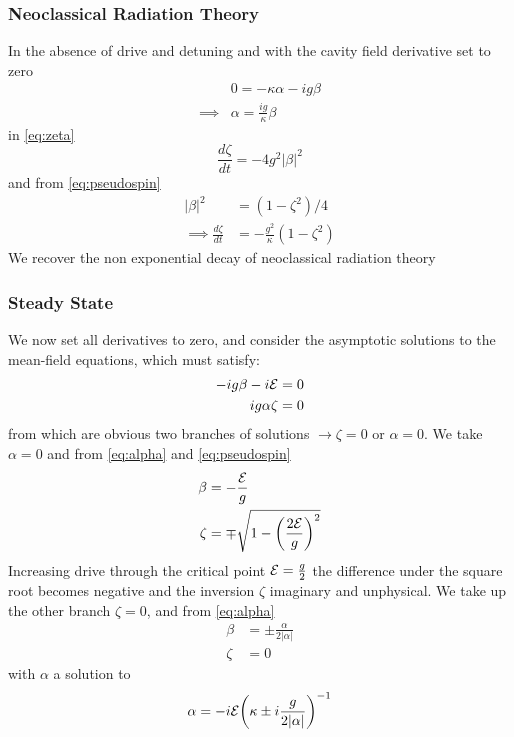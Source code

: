 \subsubsection{Neoclassical Radiation Theory}
In the absence of drive and detuning and with the cavity field derivative set to zero
\begin{align}
  & 0 = -\kappa \alpha - ig \beta \\
  \implies & \alpha = \frac{ig}{\kappa} \beta
\end{align}
in \cref{eq:zeta}
\begin{equation}
  \frac{d \zeta}{dt} = -4 g^2 |\beta|^2
\end{equation}
and from \cref{eq:pseudospin}
\begin{align}
   |\beta|^2 &= (1-\zeta^2)/4 \\
\implies \frac{d \zeta}{dt} &= -\frac{g^2}{\kappa} (1-\zeta^2)
\end{align}
We recover the non exponential decay of neoclassical radiation theory
\subsubsection{Steady State}
We now set all derivatives to zero, and consider the asymptotic solutions to the mean-field equations, which must satisfy:
\begin{align}
  -ig \beta -i \mathcal{E} &= 0 \\
  ig\alpha \zeta &= 0
\end{align}
from which are obvious two branches of solutions $\rightarrow \zeta = 0$ or $\alpha = 0$. We take $\alpha = 0$ and from \cref{eq:alpha} and \cref{eq:pseudospin}
\begin{align}
  \beta &= -\frac{\mathcal{E}}{g} \\
  \zeta &= \mp \sqrt{1 - {\left( \frac{2\mathcal{E}}{g} \right)}^2}
\end{align}
Increasing drive through the critical point $\mathcal{E} = \frac{g}{2}$ the difference under the square root becomes negative and the inversion $\zeta$ imaginary and unphysical. We take up the other branch $\zeta = 0$, and from \cref{eq:alpha}
\begin{align}
  \beta &= \pm \frac{\alpha}{2|\alpha|} \\
  \zeta &= 0
\end{align}
with $\alpha$ a solution to
\begin{equation}
  \alpha = -i \mathcal{E}{\left ( \kappa \pm i \frac{g}{2|\alpha|} \right )}^{-1}
  \label{eq:alphacondnotdet}
\end{equation}

